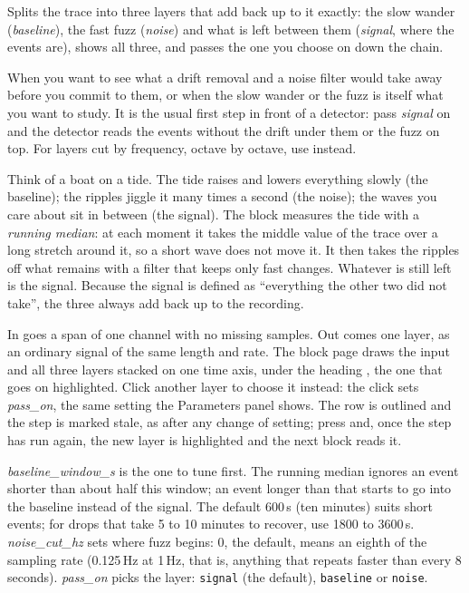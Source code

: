Splits the trace into three layers that add back up to it exactly: the slow wander
(\emph{baseline}), the fast fuzz (\emph{noise}) and what is left between them (\emph{signal},
where the events are), shows all three, and passes the one you choose on down the chain.

When you want to see what a drift removal and a noise filter would take away before you
commit to them, or when the slow wander or the fuzz is itself what you want to study. It is
the usual first step in front of a detector: pass \emph{signal} on and the detector reads the
events without the drift under them or the fuzz on top. For layers cut by frequency, octave by
octave, use  instead.

\begin{plainterms}
Think of a boat on a tide. The tide raises and lowers everything slowly (the baseline); the
ripples jiggle it many times a second (the noise); the waves you care about sit in between
(the signal). The block measures the tide with a \emph{running median}: at each moment it
takes the middle value of the trace over a long stretch around it, so a short wave does not
move it. It then takes the ripples off what remains with a filter that keeps only fast
changes. Whatever is still left is the signal. Because the signal is defined as ``everything
the other two did not take'', the three always add back up to the recording.
\end{plainterms}

In goes a span of one channel with no missing samples. Out comes one layer, as an ordinary
signal of the same length and rate. The block page draws the input and all three layers
stacked on one time axis, under the heading , the one that goes on highlighted.
Click another layer to choose it instead: the click sets \emph{pass\_on}, the same setting the
Parameters panel shows. The row is outlined and the step is marked stale, as after any change
of setting; press  and, once the step has run again, the new layer is
highlighted and the next block reads it.

\emph{baseline\_window\_s} is the one to tune first. The running median ignores an event
shorter than about half this window; an event longer than that starts to go into the
baseline instead of the signal. The default 600\,s (ten minutes) suits short events; for drops
that take 5 to 10 minutes to recover, use 1800 to 3600\,s. \emph{noise\_cut\_hz} sets where
fuzz begins: 0, the default, means an eighth of the sampling rate (0.125\,Hz at 1\,Hz, that
is, anything that repeats faster than every 8 seconds). \emph{pass\_on} picks the layer:
\texttt{signal} (the default), \texttt{baseline} or \texttt{noise}.

